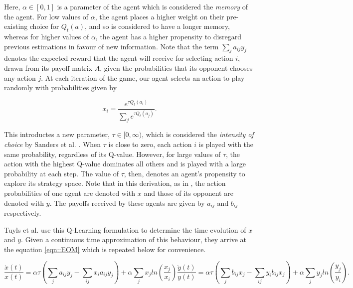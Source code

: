 \documentclass[.../main.tex]{subfiles}
\begin{document}
    Here, $\alpha \in [0, 1]$ is a parameter of the agent which is considered the {\em memory} of
    the agent. For low values of $\alpha$, the agent places a higher weight on their pre-existing
    choice for $Q_t(a)$, and so is considered to have a longer memory, whereas for higher values of
    $\alpha$, the agent has a higher propensity to disregard previous estimations in favour of new
    information. Note that the term $\sum_{j} a_{ij} y_j$ denotes the expected reward that the agent
    will receive for selecting action $i$, drawn from its payoff matrix $A$, given the probabilities
    that its opponent chooses any action $j$. At each iteration of the game, our agent selects an
    action to play randomly with probabilities given by

    \begin{equation}
    \label{eq::actionselection}
    x_{i} = \frac{e^{\tau Q_t(a_i)}}{\sum_j e^{\tau Q_t(a_j)}}.
    \end{equation}

    This introductes a new parameter, $\tau \in [0, \infty)$, which is considered the {\em intensity
    of choice} by Sanders et al. \cite{Sanders2018}. When $\tau$ is close to zero, each action $i$
    is played with the same probability, regardless of its Q-value. However, for large values of
    $\tau$, the action with the highest Q-value dominates all others and is played with a large
    probability at each step. The value of $\tau$, then, denotes an agent's propensity to explore
    its strategy space. Note that in this derivation, as in \cite{Tuyls2006AnGames}, the
    action probabilities of one agent are denoted with $x$ and those of its opponent are denoted
    with $y$. The payoffs received by these agents are given by $a_{ij}$ and $b_{ij}$ respectively.

    Tuyls et al. use this Q-Learning formulation to determine the time evolution of $x$ and $y$.
    Given a continuous time approximation of this behaviour, they arrive at the equation 
    \ref{eqn::EOM} which is repeated below for convenience.

     \begin{subequations}
        \begin{equation}
            \frac{\dot{x}(t)}{x(t)} = \alpha \tau (\sum_{j} a_{ij} y_j - \sum_{i j} x_i a_{ij} y_j)
            + \alpha \sum_j x_j ln(\frac{x_j}{x_i}) 
        \end{equation}
        \begin{equation}
            \frac{\dot{y}(t)}{y(t)} = \alpha \tau (\sum_{j} b_{ij} x_j - \sum_{i j} y_i b_{ij} x_j)
            + \alpha \sum_j y_j ln(\frac{y_j}{y_i}).
    \end{equation}
    \end{subequations}
\end{document}
